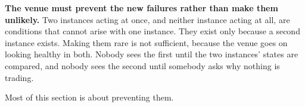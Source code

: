 \textbf{The venue must prevent the new failures rather than make them unlikely.}
Two instances acting at once, and neither instance acting at all, are conditions
that cannot arise with one instance. They exist only because a second instance
exists. Making them rare is not sufficient, because the venue goes on looking
healthy in both. Nobody sees the first until the two instances' states are
compared, and nobody sees the second until somebody asks why nothing is trading.

Most of this section is about preventing them.











